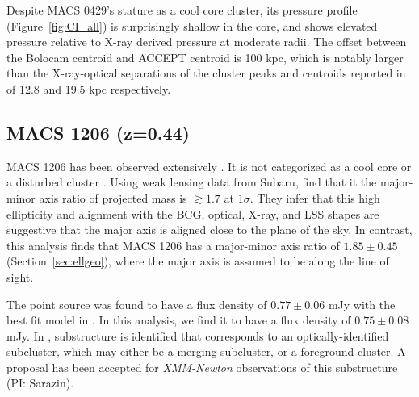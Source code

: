 Despite MACS 0429's stature as a cool core cluster, its pressure profile
(Figure~\ref{fig:CI_all}) is surprisingly shallow in the core, and shows elevated pressure relative to
X-ray derived pressure at moderate radii. The offset between the Bolocam centroid \citep{sayers2013} and ACCEPT
\citep{cavagnolo2009} centroid is 100 kpc, which is notably larger than the X-ray-optical separations of the cluster
peaks and centroids reported in \citet{mann2012} of 12.8 and 19.5 kpc respectively.




\subsection{MACS 1206 (z=0.44)}
\label{sec:results_m1206}


MACS 1206 has been observed extensively \citep[e.g.][]{ebeling2001,ebeling2009,gilmour2009,umetsu2012,
zitrin2012a,biviano2013,sayers2013}. It is not categorized as a cool core or a disturbed cluster
\citep{sayers2013}. Using weak lensing data from Subaru, \citet{umetsu2012} 
find that it the major-minor axis ratio of projected mass is $\gtrsim 1.7$ at $1\sigma$. They infer that
this high ellipticity and alignment with the BCG, optical, X-ray, and LSS shapes are suggestive that
the major axis is aligned close to the plane of the sky. In contrast, this analysis finds that MACS 1206 
has a major-minor axis ratio of $1.85 \pm 0.45$ (Section~\ref{sec:ellgeo}), 
where the major axis is assumed to be along the line of sight.

The point source was found to have a flux density of $0.77 \pm 0.06$ mJy with the best fit model in
\citet{young2014}. In this analysis, we find it to have a flux density of $0.75 \pm 0.08$ mJy. In
\citet{young2014}, substructure is identified that corresponds to an optically-identified subcluster,
which may either be a merging subcluster, or a foreground cluster. A proposal has been accepted for
\emph{XMM-Newton} observations of this substructure (PI: Sarazin).

